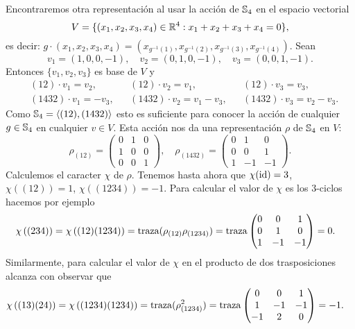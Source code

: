 \begin{example}
	Encontraremos otra representación al usar la acción de $\mathbb{S}_4$ en el
	espacio vectorial
	\[
		V=\{(x_1,x_2,x_3,x_4)\in\mathbb{R}^4:x_1+x_2+x_3+x_4=0\},
	\]
	es decir: $g\cdot (x_1,x_2,x_3,x_4)=(x_{g^{-1}(1)},x_{g^{-1}(2)},x_{g^{-1}(3)},x_{g^{-1}(4)})$. 
	Sean 
	\[
		v_1=(1,0,0,-1),
		\quad
		v_2=(0,1,0,-1),
		\quad
		v_3=(0,0,1,-1).
	\]
	Entonces $\{v_1,v_2,v_3\}$ es base de $V$ y 
	\begin{align*}
		&(12)\cdot v_1=v_2,&&
		(12)\cdot v_2=v_1,&&
		(12)\cdot v_3=v_3,\\
		&(1432)\cdot v_1=-v_3,&&
		(1432)\cdot v_2=v_1-v_3,&&
		(1432)\cdot v_3=v_2-v_3.
	\end{align*}
	Como $\mathbb{S}_4=\langle (12),(1432)\rangle$ esto es suficiente para conocer la
	acción de cualquier $g\in\mathbb{S}_4$ en cualquier $v\in V$.  Esta acción nos da
	una representación $\rho$ de $\mathbb{S}_4$ en $V$:
	\[
		\rho_{(12)}=\begin{pmatrix}
			0 & 1 & 0\\
			1 & 0 & 0\\
			0 & 0 & 1
		\end{pmatrix},\quad
		\rho_{(1432)}=\begin{pmatrix}
			0 & 1 & 0\\
			0 & 0 & 1\\
			1 & -1 & -1
		\end{pmatrix}.
	\]
	Calculemos el caracter $\chi$ de $\rho$. Tenemos hasta ahora que
	$\chi(\operatorname{id})=3$, $\chi\left( (12) \right)=1$, $\chi\left( (1234) \right)=-1$.
	Para calcular el valor de $\chi$ es los $3$-ciclos hacemos por ejemplo 
	\begin{align*}
		&\chi\left( (234) \right)=\chi\left( (12)(1234) \right)=\operatorname{traza}(\rho_{(12)}\rho_{(1234)})=\operatorname{traza}\begin{pmatrix}
			0 & 0 & 1\\
			0 & 1 & 0\\
			1 & -1 & -1
		\end{pmatrix}
		=0.
	\end{align*}
	Similarmente, para calcular el valor de $\chi$ en el producto de dos
	trasposiciones alcanza con observar que 
	\begin{align*}
		&\chi\left( (13)(24) \right)=\chi\left( (1234)(1234) \right)=\operatorname{traza}(\rho_{(1234)}^2)=\operatorname{traza}\begin{pmatrix}
			0 & 0 & 1\\
			1 & -1 & -1\\
			-1 & 2 & 0
		\end{pmatrix}
		=-1.
	\end{align*}

\end{example}
